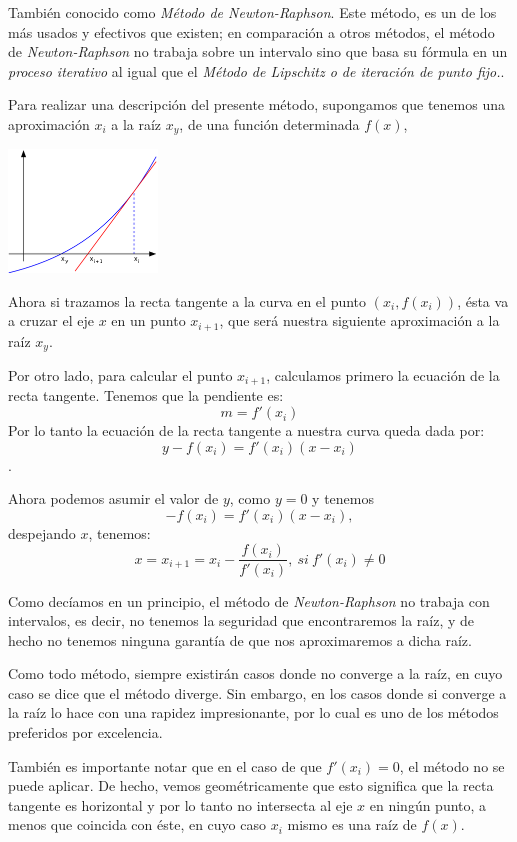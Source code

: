 También conocido como \emph{Método de Newton-Raphson}.
Este método, es un de los más usados y efectivos que existen; en comparación a otros métodos,
el método de \emph{Newton-Raphson} no trabaja sobre un intervalo sino que basa su fórmula en un \emph{proceso iterativo}
al igual que el \emph{Método de Lipschitz o de iteración de punto fijo.}.

Para realizar una descripción del presente método,
supongamos que tenemos una aproximación $x_{i}$ a la raíz $x_{y}$,
de una función determinada $f(x)$,

\begin{center}
	\includegraphics[width=150px]{img/newton}
\end{center}

Ahora si trazamos la recta tangente a la curva en el punto $(x_{i},f(x_{i}))$,
ésta va a cruzar el eje $x$ en un punto $x_{i+1}$,
que será nuestra siguiente aproximación a la raíz $x_{y}$.

Por otro lado, para calcular el punto $x_{i+1}$, calculamos primero la ecuación de la recta tangente.
Tenemos que la pendiente es:
$$m=f'(x_{i})$$
Por lo tanto la ecuación de la recta tangente a nuestra curva queda dada por:
$$y-f(x_{i}) = f'(x_{i})(x-x_{i})$$.

Ahora podemos asumir el valor de $y$, como $y=0$ y tenemos
$$-f(x_{i}) = f'(x_{i})(x-x_{i}),$$
despejando $x$, tenemos:
$$x=x_{i+1}=x_{i}-\frac{f(x_{i})}{f'(x_{i})},\ si\ f'(x_{i}) \neq 0$$

Como decíamos en un principio, el método de \emph{Newton-Raphson}  no trabaja con intervalos,
es decir, no tenemos la seguridad que encontraremos la raíz,
y de hecho no tenemos ninguna garantía de que nos aproximaremos a dicha raíz.

Como todo método, siempre existirán casos donde no converge a la raíz,
en cuyo caso se dice que el método diverge.
Sin embargo,
en los casos donde si converge a la raíz lo hace con una rapidez impresionante,
por lo cual es uno de los métodos preferidos por excelencia.

También es importante notar que en el caso de que $f'(x_{i}) = 0$,
el método no se puede aplicar.
De hecho, vemos geométricamente que esto significa que la recta tangente es horizontal
y por lo tanto no intersecta al eje $x$ en ningún punto,
a menos que coincida con éste, en cuyo caso $x_{i}$ mismo es una raíz de $f(x)$.
